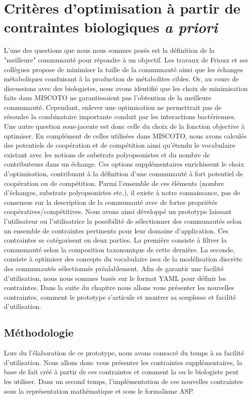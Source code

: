 \documentclass[../main.tex]{subfiles}
\begin{document}
\section{Critères d'optimisation à partir de contraintes biologiques \textit{a priori}}
L'une des questions que nous nous sommes posés est la définition de la "meilleure" communauté pour répondre à un objectif. Les travaux de Frioux et ses collègues \citep{Frioux2018} propose de minimiser la taille de la communauté ainsi que les échanges métaboliques conduisant à la production de métabolites cibles. Or, au cours de discussions avec des biologistes, nous avons identifié que les choix de minimisation faits dans MISCOTO ne garantissaient pas l'obtention de la meilleure communauté. Cependant, enlever une optimisation ne permettrait pas de résoudre la combinatoire importante conduit par les interactions bactériennes. Une autre question sous-jacente est donc celle du choix de la fonction objective à optimiser. En complément de celles utilisées dans MISCOTO, nous avons calculés des potentiels de coopération et de compétition ainsi qu'étendu le vocabulaire existant avec les notions de substrats polyopsonistes et du nombre de contributeurs dans un échange. Ces options supplémentaires enrichissent le choix d'optimisation, contribuant à la définition d'une communauté à fort potentiel de coopération ou de compétition. Parmi l'ensemble de ces éléments (nombre d'échanges, substrats polyopsonistes etc.), il existe à notre connaissance, pas de consensus sur la description de la communauté avec de fortes propriétés coopératives/compétitives. Nous avons ainsi développé un prototype laissant l'utilisateur ou l'utilisatrice la possibilité de sélectionner des communautés selon un ensemble de contraintes pertinents pour leur domaine d'application. Ces contraintes se catégorisent en deux parties. La première consiste à filtrer la communauté selon la composition taxonomique de cette dernière. La seconde, consiste à optimiser des concepts du vocabulaire issu de la modélisation discrète des communautés sélectionnés préalablement. Afin de garantir une facilité d'utilisation, nous nous sommes basés sur le format YAML pour définir les contraintes. Dans la suite du chapitre nous allons vous présenter les nouvelles contraintes, comment le prototype s'articule et montrer sa souplesse et facilité d'utilisation.

\subsection{Méthodologie}
Lors du l'élaboration de ce prototype, nous avons consacré du temps à sa facilité d'utilisation. Nous allons donc vous présenter les contraintes supplémentaires, la base de fait créé à partir de ces contraintes et comment la ou le biologiste peut les utiliser. Dans un second temps, l'implémentation de ces nouvelles contraintes sous la représentation mathématique et sous le formalisme ASP.
\end{document}
